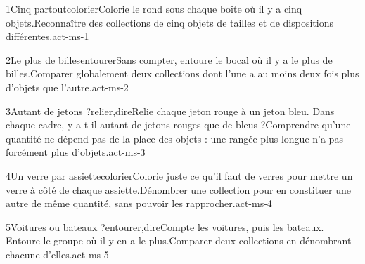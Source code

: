 \begin{activite}{1}{Cinq partout}{colorier}{Colorie le rond sous chaque boîte où il y a {\otBold\color{otNavy}cinq} objets.}{Reconnaître des collections de cinq objets de tailles et de dispositions différentes.}{act-ms-1}
\end{activite}
\begin{activite}{2}{Le plus de billes}{entourer}{Sans compter, entoure le bocal où il y a le {\otBold\color{otNavy}plus} de billes.}{Comparer globalement deux collections dont l’une a au moins deux fois plus d’objets que l’autre.}{act-ms-2}
\end{activite}
\begin{activite}{3}{Autant de jetons ?}{relier,dire}{Relie chaque jeton rouge à un jeton bleu. Dans chaque cadre, y a-t-il {\otBold\color{otNavy}autant} de jetons rouges que de bleus ?}{Comprendre qu’une quantité ne dépend pas de la place des objets : une rangée plus longue n’a pas forcément plus d’objets.}{act-ms-3}
\end{activite}
\begin{activite}{4}{Un verre par assiette}{colorier}{Colorie juste ce qu’il faut de verres pour mettre {\otBold\color{otNavy}un verre} à côté de chaque assiette.}{Dénombrer une collection pour en constituer une autre de même quantité, sans pouvoir les rapprocher.}{act-ms-4}
\end{activite}
\begin{activite}{5}{Voitures ou bateaux ?}{entourer,dire}{Compte les voitures, puis les bateaux. Entoure le groupe où il y en a le {\otBold\color{otNavy}plus}.}{Comparer deux collections en dénombrant chacune d’elles.}{act-ms-5}
\end{activite}
